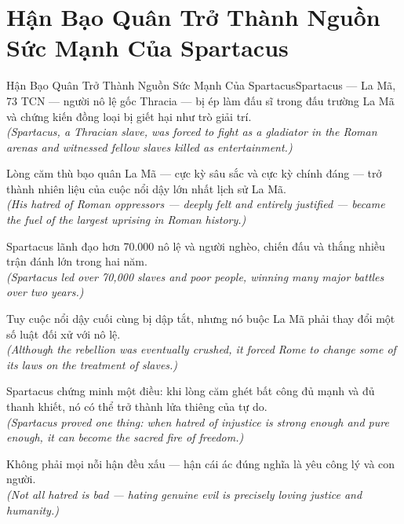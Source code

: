 \section{Hận Bạo Quân Trở Thành Nguồn Sức Mạnh Của Spartacus}
\begin{truyen}{Hận Bạo Quân Trở Thành Nguồn Sức Mạnh Của Spartacus}{Spartacus --- La Mã, 73 TCN}
 --- người nô lệ gốc Thracia --- bị ép làm đấu sĩ trong đấu trường La Mã và chứng kiến đồng loại bị giết hại như trò giải trí.\\[4pt]
\textit{(Spartacus, a Thracian slave, was forced to fight as a gladiator in the Roman arenas and witnessed fellow slaves killed as entertainment.)}

Lòng căm thù bạo quân La Mã --- cực kỳ sâu sắc và cực kỳ chính đáng --- trở thành nhiên liệu của cuộc nổi dậy lớn nhất lịch sử La Mã.\\[4pt]
\textit{(His hatred of Roman oppressors --- deeply felt and entirely justified --- became the fuel of the largest uprising in Roman history.)}

Spartacus lãnh đạo hơn 70.000 nô lệ và người nghèo, chiến đấu và thắng nhiều trận đánh lớn trong hai năm.\\[4pt]
\textit{(Spartacus led over 70,000 slaves and poor people, winning many major battles over two years.)}

Tuy cuộc nổi dậy cuối cùng bị dập tắt, nhưng nó buộc La Mã phải thay đổi một số luật đối xử với nô lệ.\\[4pt]
\textit{(Although the rebellion was eventually crushed, it forced Rome to change some of its laws on the treatment of slaves.)}

Spartacus chứng minh một điều: khi lòng căm ghét bất công đủ mạnh và đủ thanh khiết, nó có thể trở thành lửa thiêng của tự do.\\[4pt]
\textit{(Spartacus proved one thing: when hatred of injustice is strong enough and pure enough, it can become the sacred fire of freedom.)}

\end{truyen}
\begin{baihoc}
  Không phải mọi nỗi hận đều xấu --- hận cái ác đúng nghĩa là yêu công lý và con người.\\[4pt]
  \textit{(Not all hatred is bad --- hating genuine evil is precisely loving justice and humanity.)}
\end{baihoc}

